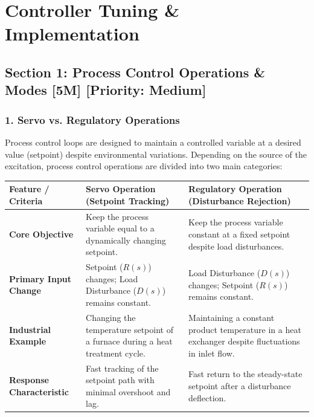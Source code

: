\chapter{Controller Tuning \& Implementation}



\section{Section 1: Process Control Operations \& Modes [5M] [Priority: Medium]}

\subsection{1. Servo vs. Regulatory Operations}
Process control loops are designed to maintain a controlled variable at a desired value (setpoint) despite environmental variations. Depending on the source of the excitation, process control operations are divided into two main categories:

\begin{table}[H]
\centering
\begin{tabular}{|p{}|p{}|p{}|}
\hline
Feature / Criteria & Servo Operation (Setpoint Tracking) & Regulatory Operation (Disturbance Rejection) \\
\hline
\textbf{Core Objective} & Keep the process variable equal to a dynamically changing setpoint. & Keep the process variable constant at a fixed setpoint despite load disturbances. \\
\hline
\textbf{Primary Input Change} & Setpoint ($R(s)$) changes; Load Disturbance ($D(s)$) remains constant. & Load Disturbance ($D(s)$) changes; Setpoint ($R(s)$) remains constant. \\
\hline
\textbf{Industrial Example} & Changing the temperature setpoint of a furnace during a heat treatment cycle. & Maintaining a constant product temperature in a heat exchanger despite fluctuations in inlet flow. \\
\hline
\textbf{Response Characteristic} & Fast tracking of the setpoint path with minimal overshoot and lag. & Fast return to the steady-state setpoint after a disturbance deflection. \\
\hline
\end{tabular}
\end{table}

